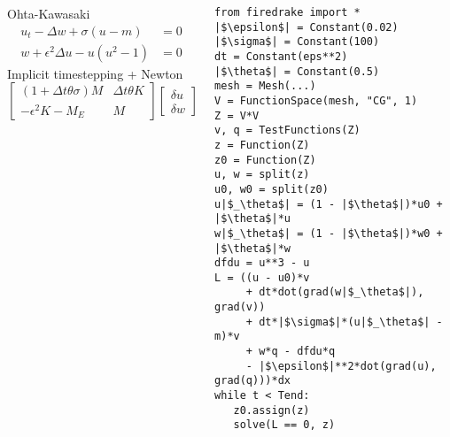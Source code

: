 \documentclass[presentation]{beamer}
\begin{document}
\begin{frame}[fragile]
  \begin{columns}
    \begin{column}{0.5\textwidth}
      \begin{block}{Ohta-Kawasaki}
        \small
        \begin{align*}
          u_t - \Delta w + \sigma(u - m) &= 0\\
          w + \epsilon^2 \Delta u - u(u^2 - 1) &= 0
        \end{align*}
        Implicit timestepping + Newton
        \begin{equation*}
          \begin{bmatrix}
            (1 + \Delta t \theta \sigma)M  & \Delta t\theta K \\
            -\epsilon^2 K - M_E & M
          \end{bmatrix}
          \begin{bmatrix}
            \delta u \\
            \delta w
          \end{bmatrix} =
          \begin{bmatrix}
            f_1 \\
            f_2
          \end{bmatrix}
        \end{equation*}
      \end{block}
    \end{column}
    \begin{column}{0.5\textwidth}
\begin{verbatim}
from firedrake import *
|$\epsilon$| = Constant(0.02)
|$\sigma$| = Constant(100)
dt = Constant(eps**2)
|$\theta$| = Constant(0.5)
mesh = Mesh(...)
V = FunctionSpace(mesh, "CG", 1)
Z = V*V
v, q = TestFunctions(Z)
z = Function(Z)
z0 = Function(Z)
u, w = split(z)
u0, w0 = split(z0)
u|$_\theta$| = (1 - |$\theta$|)*u0 + |$\theta$|*u
w|$_\theta$| = (1 - |$\theta$|)*w0 + |$\theta$|*w
dfdu = u**3 - u
L = ((u - u0)*v
     + dt*dot(grad(w|$_\theta$|), grad(v))
     + dt*|$\sigma$|*(u|$_\theta$| - m)*v
     + w*q - dfdu*q
     - |$\epsilon$|**2*dot(grad(u), grad(q)))*dx
while t < Tend:
   z0.assign(z)
   solve(L == 0, z)
\end{verbatim}
    \end{column}
  \end{columns}
\end{frame}
\end{document}
